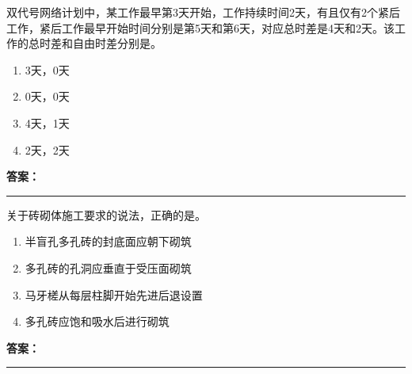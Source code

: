 \documentclass[UTF8,fontset=fandol,11pt]{ctexart}
\newcommand{\answerline}{\textcolor{answerred}{\rule{2.4cm}{0.7pt}}}
\begin{document}
\begin{quizbox}[title={乱序第 208 题｜第十一章网络计划技术}]

双代号网络计划中，某工作最早第3天开始，工作持续时间2天，有且仅有2个紧后工作，紧后工作最早开始时间分别是第5天和第6天，对应总时差是4天和2天。该工作的总时差和自由时差分别是。\\

\begin{enumerate}[label=\Alph*.]

\item 3天，0天

\item 0天，0天

\item 4天，1天

\item 2天，2天

\end{enumerate}

\textbf{\textcolor{answerred}{答案：}} \answerline

\end{quizbox}

\vspace{0.2em}

\begin{quizbox}[title={乱序第 209 题｜第六章砌筑工程}]

关于砖砌体施工要求的说法，正确的是。\\

\begin{enumerate}[label=\Alph*.]

\item 半盲孔多孔砖的封底面应朝下砌筑

\item 多孔砖的孔洞应垂直于受压面砌筑

\item 马牙槎从每层柱脚开始先进后退设置

\item 多孔砖应饱和吸水后进行砌筑

\end{enumerate}

\textbf{\textcolor{answerred}{答案：}} \answerline

\end{quizbox}

\vspace{0.2em}
\end{document}
